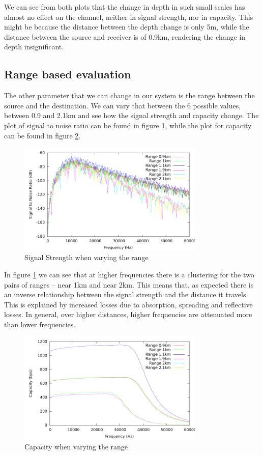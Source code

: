 \documentclass[a4paper]{IEEEtran}
\begin{document}
We can see from both plots that the change in depth in such small
scales has almost no effect on the channel, neither in signal
strength, nor in capacity. This might be because the distance between
the depth change is only 5m, while the distance between the source and
receiver is of 0.9km, rendering the change in depth insignificant.

\subsection{Range based evaluation}
\label{subsec:range}

The other parameter that we can change in our system is the range
between the source and the destination. We can vary that between the 6
possible values, between 0.9 and 2.1km and see how the signal strength
and capacity change. The plot of signal to noise ratio can be found in
figure \ref{fig:sig2noiseRange}, while the plot for capacity can be
found in figure \ref{fig:capRange}.

\begin{figure}[ht]
  \centering
  \includegraphics[width=3.5in]{../postprocessing/sig2noiseRange.pdf}
  \caption{\small{Signal Strength when varying the range}}
  \label{fig:sig2noiseRange}
\end{figure}

In figure \ref{fig:sig2noiseRange} we can see that at higher
frequencies there is a clustering for the two pairs of ranges -- near
1km and near 2km. This means that, as expected there is an inverse
relationship between the signal strength and the distance it
travels. This is explained by increased losses due to absorption,
spreading and reflective losses. In general, over higher distances,
higher frequencies are attenuated more than lower frequencies.

\begin{figure}[ht]
  \centering
  \includegraphics[width=3.5in]{../postprocessing/capacityRange.pdf}
  \caption{\small{Capacity when varying the range}}
  \label{fig:capRange}
\end{figure}
\end{document}
